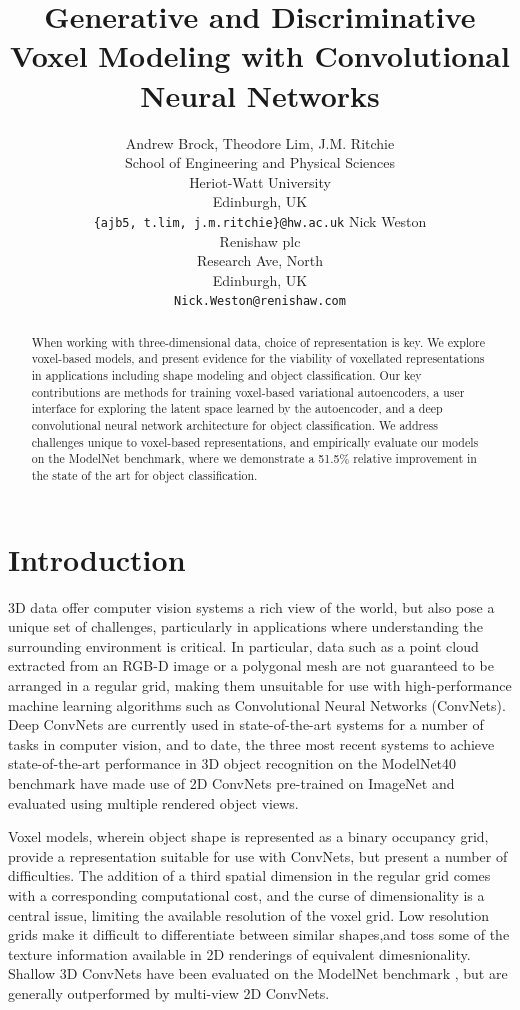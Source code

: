 \documentclass{article}
\title{Generative and Discriminative Voxel Modeling with Convolutional Neural Networks}
\author{
  Andrew Brock,
  Theodore Lim,
  J.M. Ritchie\\
  School of Engineering and Physical Sciences\\
  Heriot-Watt University\\
  Edinburgh, UK\\
  \texttt{\{ajb5, t.lim, j.m.ritchie\}@hw.ac.uk}
  \And Nick Weston\\
  Renishaw plc\\
  Research Ave, North\\
  Edinburgh, UK\\
  \texttt{Nick.Weston@renishaw.com}
}
\begin{document}
\maketitle
\begin{abstract}
When working with three-dimensional data, choice of representation is key. We explore voxel-based models, and present evidence for the viability of voxellated representations in applications including shape modeling and object classification. Our key contributions are methods for training voxel-based variational autoencoders, a user interface for exploring the latent space learned by the autoencoder, and a deep convolutional neural network architecture for object classification. We address challenges unique to voxel-based representations, and empirically evaluate our models on the ModelNet benchmark, where we demonstrate a 51.5\% relative improvement in the state of the art for object classification.
\end{abstract}

\section{Introduction}
\label{INTRO}
3D data offer computer vision systems a rich view of the world, but also pose a unique set of challenges, particularly in applications where understanding the surrounding environment is critical. In particular, data such as a point cloud extracted from an RGB-D image or a polygonal mesh are not guaranteed to be arranged in a regular grid, making them unsuitable for use with high-performance machine learning algorithms such as Convolutional Neural Networks (ConvNets). Deep ConvNets are currently used in state-of-the-art systems for a number of tasks in computer vision, and to date, the three most recent systems to achieve state-of-the-art performance in 3D object recognition on the ModelNet40 \citep{3DShapeNets} benchmark have made use of 2D ConvNets pre-trained on ImageNet \citep{MVCNN}\citep{Pairwise} \citep{FusionNets} and evaluated using multiple rendered object views.

Voxel models, wherein object shape is represented as a binary occupancy grid, provide a representation suitable for use with ConvNets, but present a number of difficulties. The addition of a third spatial dimension in the regular grid comes with a corresponding computational cost, and the curse of dimensionality is a central issue, limiting the available resolution of the voxel grid. Low resolution grids make it difficult to differentiate between similar shapes,and toss some of the texture information available in 2D renderings of equivalent dimesnionality. Shallow 3D ConvNets have been evaluated on the ModelNet benchmark \citep{VoxNet} \citep{ORION}, but are generally outperformed by multi-view 2D ConvNets.
\end{document}
